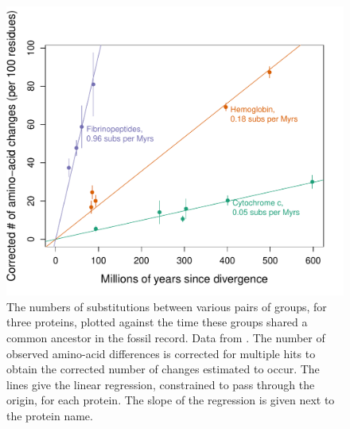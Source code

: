 \begin{figure}
\begin{center}
\includegraphics[width=0.8 \textwidth]{Journal_figs/genetic_drift/Molecular_clock_Dickerson/Dickerson_1979_mole_clock_fig.pdf}
\end{center}
\caption{The numbers of substitutions between various pairs of groups, for three proteins, plotted against the time these groups shared a common ancestor in the fossil record. Data from  \citet{dickerson1971structure}. The number of observed amino-acid differences is corrected for multiple hits to obtain the corrected number of changes estimated to occur. The lines give the linear regression, constrained to pass through the origin, for each protein. The slope of the regression is given next to the protein name. } \label{fig:Dickerson_mole_clock}  
\end{figure}


